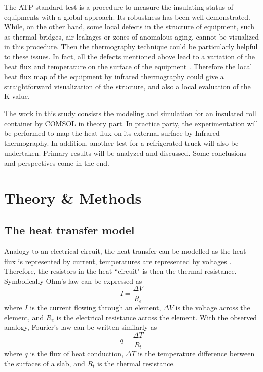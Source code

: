 The ATP standard test is a procedure to measure the insulating status of equipments with a global approach. Its robustness has been well demonstrated. While, on the other hand, some local defects in the structure of equipment, such as thermal bridges, air leakages or zones of anomalous aging, cannot be visualized in this procedure. Then the thermography technique could be particularly helpful to these issues. In fact, all the defects mentioned above lead to a variation of the heat flux and temperature on the surface of the equipment \citep{grinzatoquality,grinzato1comparison}. Therefore the local heat flux map of the equipment by infrared thermography could give a straightforward visualization of the structure, and also a local evaluation of the K-value.

The work in this study consists the modeling and simulation for an insulated roll container by COMSOL in theory part. In practice party, the experimentation will be performed to map the heat flux on its external surface by Infrared thermography. In addition, another test for a refrigerated truck will also be undertaken. Primary results will be analyzed and discussed. Some conclusions and perspectives come in the end.


\section{Theory \& Methods}
\subsection{The heat transfer model}
Analogy to an electrical circuit, the heat transfer can be modelled as the heat flux is represented by current, temperatures are represented by voltages \citep{Therm_Re}. Therefore, the resistors in the heat ``circuit" is then the thermal resistance. Symbolically Ohm’s law can be expressed as
\begin{equation}
I = \frac{\Delta V}{R_e}
\end{equation}
where $I$ is the current flowing through an element, $\Delta V$ is the voltage across the element, and $R_e$ is the electrical resistance across the element. With the observed analogy, Fourier’s law can be written similarly as
\begin{equation}
q = \frac{\Delta T}{R_t}
\end{equation}
where $q$ is the flux of heat conduction, $\Delta T$ is the temperature difference between the surfaces of a slab, and $R_t$ is the thermal resistance.

